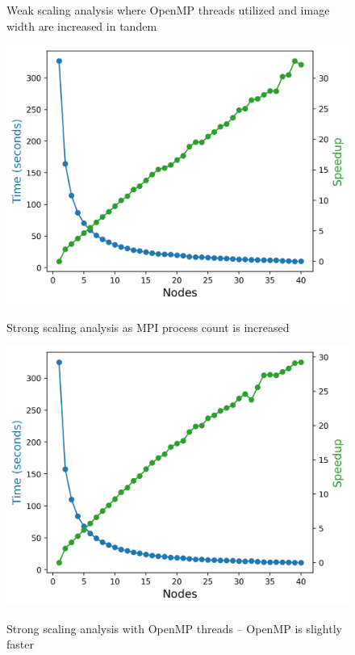 \begin{figure}[h]
\begin{minipage}{0.45\linewidth}
      \caption{Weak scaling analysis where OpenMP threads utilized and image width are increased in tandem}
        \label{fig:omp_weak2}
    \end{minipage}
  \begin{minipage}{0.45\linewidth}
      \includegraphics[width=\linewidth]{figs/mpi_strong.out}
	  \caption{Strong scaling analysis as MPI process count is increased}
      \label{fig:mpi_strong}
    \end{minipage}
  \hspace{.05\linewidth}
 \begin{minipage}{0.45\linewidth}
  \includegraphics[width=\linewidth]{figs/omp_strong.out}
  \caption{Strong scaling analysis with OpenMP threads -- OpenMP is slightly faster}
    \label{fig:omp_strong}
    \end{minipage}
\end{figure}

